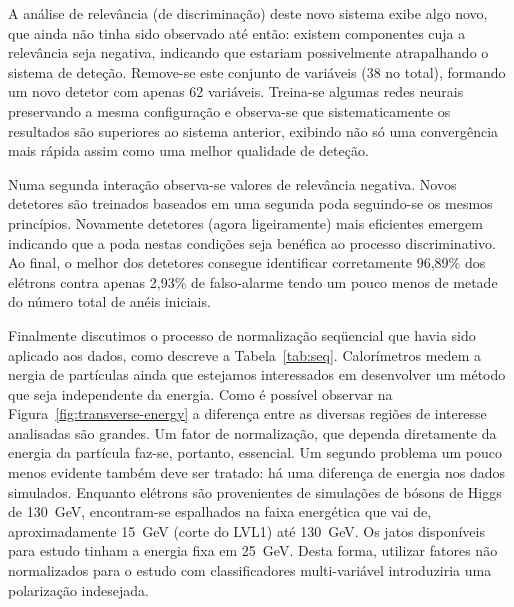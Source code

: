 A análise de relevância (de discriminação) deste novo sistema exibe algo novo,
que ainda não tinha sido observado até então: existem componentes cuja a
relevância seja negativa, indicando que estariam possivelmente atrapalhando o
sistema de deteção. Remove-se este conjunto de variáveis (38 no total),
formando um novo detetor com apenas 62 variáveis. Treina-se algumas redes
neurais preservando a mesma configuração e observa-se que sistematicamente os
resultados são superiores ao sistema anterior, exibindo não só uma
convergência mais rápida assim como uma melhor qualidade de deteção. 

Numa segunda interação observa-se valores de relevância negativa. Novos
detetores são treinados baseados em uma segunda poda seguindo-se os mesmos
princípios. Novamente detetores (agora ligeiramente) mais eficientes emergem
indicando que a poda nestas condições seja benéfica ao processo
discriminativo. Ao final, o melhor dos detetores consegue identificar
corretamente 96,89\% dos elétrons contra apenas 2,93\% de falso-alarme tendo
um pouco menos de metade do número total de anéis iniciais.

Finalmente discutimos o processo de normalização seqüencial que havia sido
aplicado aos dados, como descreve a Tabela~\ref{tab:seq}. Calorímetros medem a
nergia de partículas ainda que estejamos interessados em desenvolver um método
que seja independente da energia. Como é possível observar na
Figura~\ref{fig:transverse-energy} a diferença entre as diversas regiões de
interesse analisadas são grandes. Um fator de normalização, que dependa
diretamente da energia da partícula faz-se, portanto, essencial. Um segundo
problema um pouco menos evidente também deve ser tratado: há uma diferença de
energia nos dados simulados. Enquanto elétrons são provenientes de simulações
de bósons de Higgs de 130~GeV, encontram-se espalhados na faixa energética que
vai de, aproximadamente 15~GeV (corte do LVL1) até 130~GeV. Os jatos
disponíveis para estudo tinham a energia fixa em 25~GeV. Desta forma, utilizar
fatores não normalizados para o estudo com classificadores multi-variável
introduziria uma polarização indesejada.

